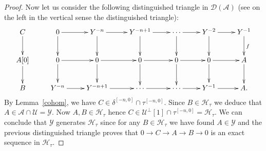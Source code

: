 \documentclass{proc-l}
\theoremstyle{definition}
\theoremstyle{remark}
\numberwithin{equation}{section}
\begin{document}
\begin{proof}
Now let us consider the following distinguished triangle in $\mathcal{D}(\mathcal{A})$ (see on the left in the vertical sense the distinguished triangle):
\[
\xymatrix{
C\ar[d] & 0\ar[r]\ar[d] & Y^{-n}\ar[r]\ar[d]	& Y^{-n+1}\ar[r]\ar[d]		&	\cdots\ar[r]\ar[d]&
Y^{-2}\ar[r]\ar[d] &
Y^{-1}\ar[d]^{f} \\
A[0]\ar[d] &0\ar[r]\ar[d] & 0\ar[r]\ar[d] & 0\ar[r] \ar[d] &0\ar[r] \ar[d] &  0\ar[r] \ar[d] &A\ar[d]\\
B &  Y^{-n}\ar[r] & Y^{-n+1}\ar[r]&	\cdots\ar[r] & \cdots\ar[r] &Y^{-1}\ar[r] &A. \\
}
\]
By Lemma~\ref{cohom}, we have $C\in\delta^{[-n,0]}\cap\tau^{[-n,0]}$.
Since $B\in\mathcal{H}_\tau$ we deduce that $A\in \mathcal{A}\cap\mathcal{U}=\mathcal{Y}$.
Now $A,B\in\mathcal{H}_\tau$ hence $C\in\mathcal{U}^\perp[1]\cap\tau^{[-n,0]}=\mathcal{H}_\tau$.
We can conclude that $\mathcal{Y}$ generates $\mathcal{H}_\tau$  since for any $B\in\mathcal{H}_\tau$ we have found
$A\in\mathcal{Y}$ and the previous distinguished triangle proves that
$0\to C \to A\to B\to 0$ is an exact sequence in $\mathcal{H}_\tau$.

\end{proof}
\end{document}
